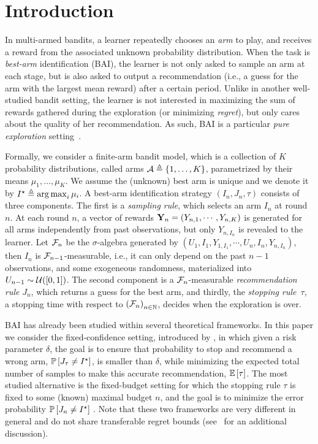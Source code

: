 \section{Introduction}\label{sec:t3c.intro}

In multi-armed bandits, a learner repeatedly chooses an \emph{arm} to play, and receives a reward from the associated unknown probability distribution. When the task is \emph{best-arm} identification (BAI), the learner is not only asked to sample an arm at each stage, but is also asked to output a recommendation (i.e., a guess for the arm with the largest mean reward) after a certain period. Unlike in another well-studied bandit setting, the learner is not interested in maximizing the sum of rewards gathered during the exploration (or minimizing \emph{regret}), but only cares about the quality of her recommendation. As such, BAI is a particular \emph{pure exploration} setting~\citep{bubeck2009pure}.

Formally, we consider a finite-arm bandit model, which is a collection of $K$ probability distributions, called arms $\mathcal{A}\triangleq\{1,\ldots,K\}$, parametrized by their means $\mu_1, \ldots, \mu_K$. We assume the (unknown) best arm is unique and we denote it by $I^\star \triangleq \operatorname*{arg\,max}_i \mu_i$. A best-arm identification strategy $(I_n, J_n, \tau)$ consists of three components. The first is a \emph{sampling rule}, which selects an arm $I_n$ at round $n$. At each round $n$, a vector of rewards ${\bf Y}_n = (Y_{n,1},\cdots,Y_{n,K})$ is generated for all arms independently from past observations, but only $Y_{n,I_n}$ is revealed to the learner. Let $\mathcal{F}_n$ be the $\sigma$-algebra generated by  $(U_1,I_1,Y_{1,I_1},\cdots,U_n,I_{n},Y_{n,I_{n}})$, then $I_n$ is $\mathcal{F}_{n-1}$-measurable, i.e., it can only depend on the past $n-1$ observations, and some exogeneous randomness, materialized into $U_{n-1} \sim \mathcal{U}([0,1])$. The second component is a $\mathcal{F}_{n}$-measurable \emph{recommendation rule} $J_n$, which returns a guess for the best arm, and thirdly, the  \emph{stopping rule}~$\tau$, a stopping time with respect to $\left(\mathcal{F}_{n}\right)_{n \in \mathbb{N}}$, decides when the exploration is over.

BAI has already been studied within several theoretical frameworks. In this paper we consider the fixed-confidence setting, introduced by \cite{even-dar2003confidence}, in which given a risk parameter $\delta$, the goal is to ensure that probability to stop and recommend a wrong arm, $\mathbb{P}\left[J_\tau \neq I^\star\right]$, is smaller than $\delta$, while minimizing the expected total number of samples to make this accurate recommendation, $\mathbb{E}\left[\tau\right]$. The most studied alternative is the fixed-budget setting for which the stopping rule $\tau$ is fixed to some (known) maximal budget $n$, and the goal is to minimize the error probability $\mathbb{P}\left[J_n \neq I^\star\right]$ \citep{audibert2010budget}. Note that these two frameworks are very different in general and do not share transferable regret bounds (see~\citealt{carpentier2016budget} for an additional discussion).

